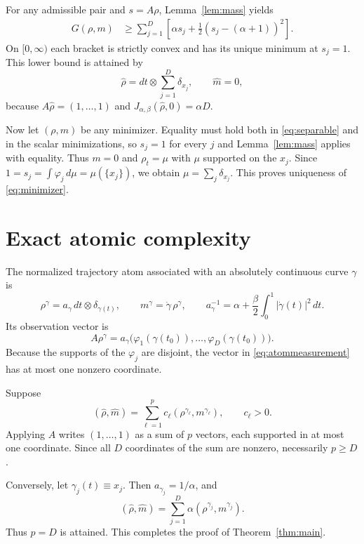 \documentclass[11pt]{article}
\begin{document}
For any admissible pair and $s=A\rho$, Lemma~\ref{lem:mass} yields
\begin{align}\label{eq:separable}
 G(\rho,m)
 &\ge \sum_{j=1}^D
 \left[\alpha s_j+\frac12(s_j-(\alpha+1))^2\right].
\end{align}
On $[0,\infty)$ each bracket is strictly convex and has its unique minimum at
$s_j=1$.  This lower bound is attained by
\begin{equation}\label{eq:minimizer}
 \widehat\rho=dt\otimes\sum_{j=1}^D\delta_{x_j},
 \qquad \widehat m=0,
\end{equation}
because $A\widehat\rho=(1,\ldots,1)$ and
$J_{\alpha,\beta}(\widehat\rho,0)=\alpha D$.

Now let $(\rho,m)$ be any minimizer.  Equality must hold both in
\eqref{eq:separable} and in the scalar minimizations, so $s_j=1$ for every
$j$ and Lemma~\ref{lem:mass} applies with equality.  Thus
$m=0$ and $\rho_t=\mu$ with $\mu$ supported on the $x_j$.  Since
$1=s_j=\int\varphi_j\,d\mu=\mu(\{x_j\})$, we obtain
$\mu=\sum_j\delta_{x_j}$.  This proves uniqueness of \eqref{eq:minimizer}.

\section{Exact atomic complexity}

The normalized trajectory atom associated with an absolutely continuous curve
$\gamma$ is
\[
 \rho^\gamma=a_\gamma\,dt\otimes\delta_{\gamma(t)},
 \qquad m^\gamma=\dot\gamma\,\rho^\gamma,
 \qquad
 a_\gamma^{-1}=\alpha+\frac\beta2\int_0^1|\dot\gamma(t)|^2\,dt.
\]
Its observation vector is
\begin{equation}\label{eq:atommeasurement}
 A\rho^\gamma
 =a_\gamma\bigl(\varphi_1(\gamma(t_0)),\ldots,
                  \varphi_D(\gamma(t_0))\bigr).
\end{equation}
Because the supports of the $\varphi_j$ are disjoint, the vector in
\eqref{eq:atommeasurement} has at most one nonzero coordinate.

Suppose
\[
 (\widehat\rho,\widehat m)
 =\sum_{\ell=1}^p c_\ell(\rho^{\gamma_\ell},m^{\gamma_\ell}),
 \qquad c_\ell>0.
\]
Applying $A$ writes $(1,\ldots,1)$ as a sum of $p$ vectors, each supported in
at most one coordinate.  Since all $D$ coordinates of the sum are nonzero,
necessarily $p\ge D$.

Conversely, let $\gamma_j(t)\equiv x_j$.  Then $a_{\gamma_j}=1/\alpha$, and
\[
 (\widehat\rho,\widehat m)
 =\sum_{j=1}^D \alpha(\rho^{\gamma_j},m^{\gamma_j}).
\]
Thus $p=D$ is attained.  This completes the proof of
Theorem~\ref{thm:main}.
\end{document}
